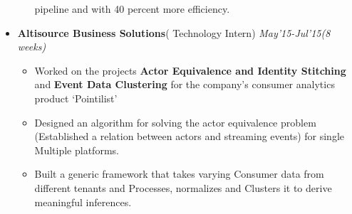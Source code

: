 \documentclass[a4paper,9pt]{extarticle}
\begin{document}
\begin{itemize}
\begin{itemize}
            pipeline and with 40 percent more efficiency.
          \end{itemize}
        \item \textbf{  Altisource Business Solutions}( Technology Intern) \hfill
          \textit{May'15-Jul'15(8 weeks)}
          \vspace{-2mm}\begin{itemize} \itemsep -2pt
          \item Worked on the projects \textbf{Actor Equivalence and Identity Stitching} and \textbf{Event Data Clustering} for the company's consumer analytics product `Pointilist'
          \item Designed an algorithm for solving the actor equivalence problem (Established a relation between actors and streaming events) for single Multiple platforms.
          \item Built a generic framework that takes varying Consumer data from different tenants and Processes, normalizes and Clusters it to derive meaningful inferences.
          \end{itemize}
        \end{itemize}
\end{document}
